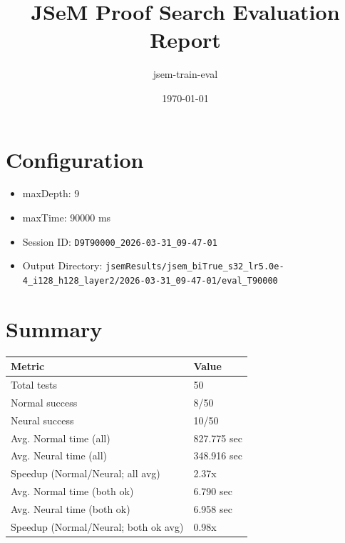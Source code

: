 \documentclass[a4paper,10pt]{article}
\title{JSeM Proof Search Evaluation Report}
\author{jsem-train-eval}
\date{\today}
\begin{document}
\maketitle

\section{Configuration}
\begin{itemize}
\item maxDepth: 9
\item maxTime: 90000 ms
\item Session ID: \texttt{D9T90000\_2026-03-31\_09-47-01}
\item Output Directory: \texttt{jsemResults/jsem\_biTrue\_s32\_lr5.0e-4\_i128\_h128\_layer2/2026-03-31\_09-47-01/eval\_T90000}
\end{itemize}

\section{Summary}
\begin{tabular}{ll}
\toprule
\textbf{Metric} & \textbf{Value} \\
\midrule
Total tests & 50 \\
Normal success & 8/50 \\
Neural success & 10/50 \\
\midrule
Avg. Normal time (all) & 827.775 sec \\
Avg. Neural time (all) & 348.916 sec \\
Speedup (Normal/Neural; all avg) & 2.37x \\
Avg. Normal time (both ok) & 6.790 sec \\
Avg. Neural time (both ok) & 6.958 sec \\
Speedup (Normal/Neural; both ok avg) & 0.98x \\
\bottomrule
\end{tabular}
\end{document}
